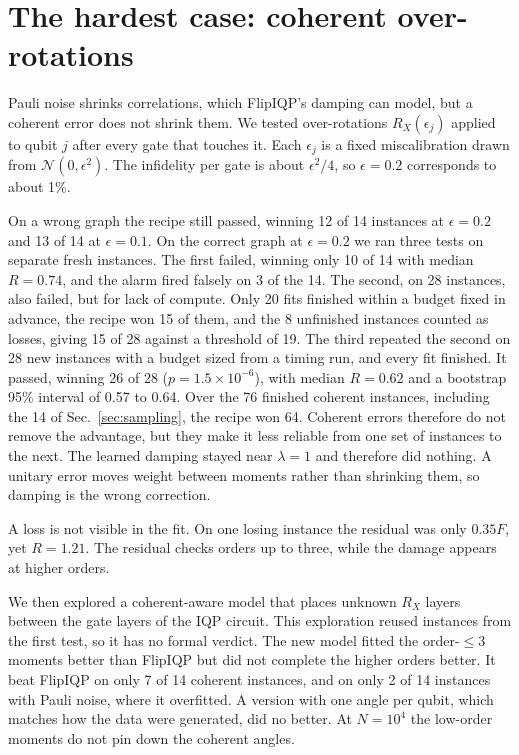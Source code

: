 \documentclass[aps,pra,twocolumn,superscriptaddress,nofootinbib]{revtex4-2}
\begin{document}
\section{The hardest case: coherent over-rotations}
\label{sec:coherent}

Pauli noise shrinks correlations, which FlipIQP's damping can model, but a coherent error does not shrink them.
We tested over-rotations $R_X(\epsilon_j)$ applied to qubit $j$ after every gate that touches it.
Each $\epsilon_j$ is a fixed miscalibration drawn from $\mathcal{N}(0,\epsilon^2)$.
The infidelity per gate is about $\epsilon^2/4$, so $\epsilon=0.2$ corresponds to about 1\%.

On a wrong graph the recipe still passed, winning 12 of 14 instances at $\epsilon=0.2$ and 13 of 14 at
$\epsilon=0.1$.
On the correct graph at $\epsilon=0.2$ we ran three tests on separate fresh instances.
The first failed, winning only 10 of 14 with median $R=0.74$, and the alarm fired falsely on 3 of the 14.
The second, on 28 instances, also failed, but for lack of compute.
Only 20 fits finished within a budget fixed in advance, the recipe won 15 of them, and the 8 unfinished instances
counted as losses, giving 15 of 28 against a threshold of 19.
The third repeated the second on 28 new instances with a budget sized from a timing run, and every fit finished.
It passed, winning 26 of 28 ($p=1.5\times10^{-6}$), with median $R=0.62$ and a bootstrap 95\% interval of 0.57 to
0.64.
Over the 76 finished coherent instances, including the 14 of Sec.~\ref{sec:sampling}, the recipe won 64.
Coherent errors therefore do not remove the advantage, but they make it less reliable from one set of instances to
the next.
The learned damping stayed near $\lambda=1$ and therefore did nothing.
A unitary error moves weight between moments rather than shrinking them, so damping is the wrong correction.

A loss is not visible in the fit.
On one losing instance the residual was only $0.35F$, yet $R=1.21$.
The residual checks orders up to three, while the damage appears at higher orders.

We then explored a coherent-aware model that places unknown $R_X$ layers between the gate layers of the IQP circuit.
This exploration reused instances from the first test, so it has no formal verdict.
The new model fitted the order-$\le3$ moments better than FlipIQP but did not complete the higher orders better.
It beat FlipIQP on only 7 of 14 coherent instances, and on only 2 of 14 instances with Pauli noise, where it overfitted.
A version with one angle per qubit, which matches how the data were generated, did no better.
At $N=10^4$ the low-order moments do not pin down the coherent angles.
\end{document}
